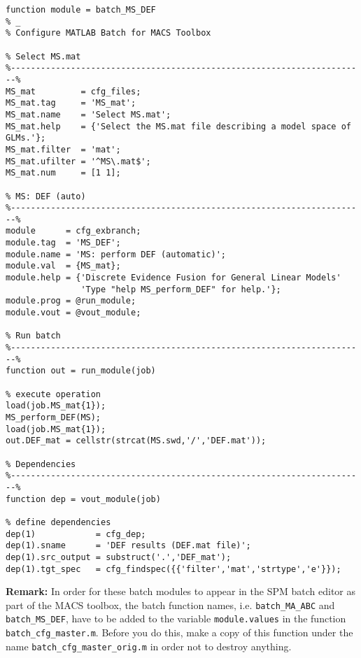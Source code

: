 \documentclass[a4paper,12pt]{article}
\begin{document}
\vspace{1em}
\begin{verbatim}
function module = batch_MS_DEF
% _
% Configure MATLAB Batch for MACS Toolbox

% Select MS.mat
%-----------------------------------------------------------------------%
MS_mat         = cfg_files;
MS_mat.tag     = 'MS_mat';
MS_mat.name    = 'Select MS.mat';
MS_mat.help    = {'Select the MS.mat file describing a model space of GLMs.'};
MS_mat.filter  = 'mat';
MS_mat.ufilter = '^MS\.mat$';
MS_mat.num     = [1 1];

% MS: DEF (auto)
%-----------------------------------------------------------------------%
module      = cfg_exbranch;
module.tag  = 'MS_DEF';
module.name = 'MS: perform DEF (automatic)';
module.val  = {MS_mat};
module.help = {'Discrete Evidence Fusion for General Linear Models'
               'Type "help MS_perform_DEF" for help.'};
module.prog = @run_module;
module.vout = @vout_module;

% Run batch
%-----------------------------------------------------------------------%
function out = run_module(job)

% execute operation
load(job.MS_mat{1});
MS_perform_DEF(MS);
load(job.MS_mat{1});
out.DEF_mat = cellstr(strcat(MS.swd,'/','DEF.mat'));

% Dependencies
%-----------------------------------------------------------------------%
function dep = vout_module(job)

% define dependencies
dep(1)            = cfg_dep;
dep(1).sname      = 'DEF results (DEF.mat file)';
dep(1).src_output = substruct('.','DEF_mat');
dep(1).tgt_spec   = cfg_findspec({{'filter','mat','strtype','e'}});
\end{verbatim}


\pagebreak
\textbf{Remark:} In order for these batch modules to appear in the SPM batch editor as part of the MACS toolbox, the batch function names, i.e. \texttt{batch\_MA\_ABC} and \texttt{batch\_MS\_DEF}, have to be added to the variable \texttt{module.values} in the function \texttt{batch\_cfg\_master.m}. Before you do this, make a copy of this function under the name \texttt{batch\_cfg\_master\_orig.m} in order not to destroy anything.
\end{document}
